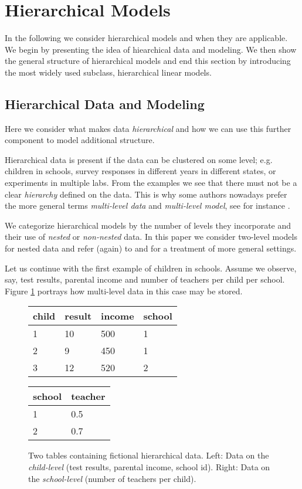 \setlength{\abovedisplayskip}{2pt}
\setlength{\belowdisplayskip}{2pt}
\section{Hierarchical Models}
\label{sec:hierachical_modeling}
In the following we consider hierarchical models and when they are applicable.
We begin by presenting the idea of hiearchical data and modeling.
We then show the general structure of hierarchical models and end this section by introducing the most widely used subclass, hierarchical linear models.

\subsection{Hierarchical Data and Modeling}
Here we consider what makes data \emph{hierarchical} and how we can use this further component to model additional structure.

Hierarchical data is present if the data can be clustered on some level; e.g. children in schools, survey responses in different years in different states, or experiments in multiple labs.
From the examples we see that there must not be a clear \emph{hierarchy} defined on the data.
This is why some authors nowadays prefer the more general terms \emph{multi-level data} and \emph{multi-level model}, see for instance \citet{GelmanHill2007}.

We categorize hierarchical models by the number of levels they incorporate and their use of \emph{nested} or \emph{non-nested} data.
In this paper we consider two-level models for nested data and refer (again) to \citet{GelmanHill2007} and \citet{snijders1999} for a treatment of more general settings.

Let us continue with the first example of children in schools.
Assume we observe, say, test results, parental income and number of teachers per child per school.
Figure \ref{fig:relational_table} portrays how multi-level data in this case may be stored.
\begin{figure}[!ht]
\begin{center}
\begin{tabular}{l l l l}
child & result & income & school\\
\hline
1 & 10 & 500 & 1\\
2 & 9 & 450 & 1\\
3 & 12 & 520 & 2
\end{tabular}
\quad
\begin{tabular}{l l}
school & teacher\\
\hline
1 & 0.5\\
2 & 0.7
\end{tabular}
\end{center}
\caption{Two tables containing fictional hierarchical data. Left: Data on the \emph{child-level} (test results, parental income, school id). Right: Data on the \emph{school-level} (number of teachers per child).}
\label{fig:relational_table}
\end{figure}

